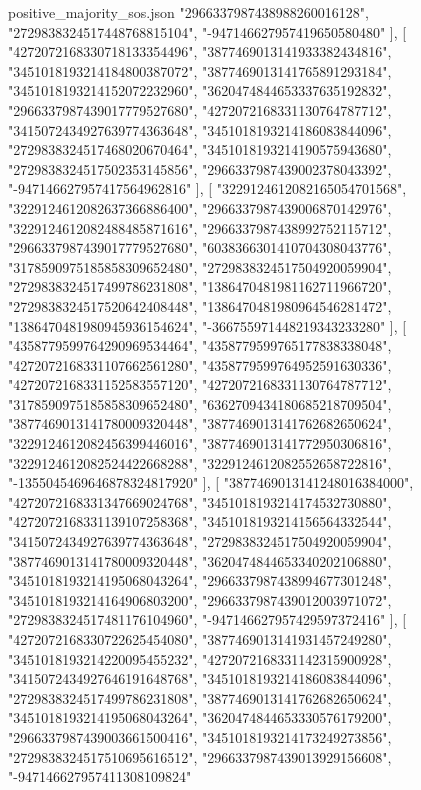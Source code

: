 \begin{filecontents*}[overwrite]{positive_majority_sos.json}
    "2966337987438988260016128",
    "2729838324517448768815104",
    "-947146627957419650580480"
   ],
   [
    "4272072168330718133354496",
    "3877469013141933382434816",
    "3451018193214184800387072",
    "3877469013141765891293184",
    "3451018193214152072232960",
    "3620474844653337635192832",
    "2966337987439017779527680",
    "4272072168331130764787712",
    "3415072434927639774363648",
    "3451018193214186083844096",
    "2729838324517468020670464",
    "3451018193214190575943680",
    "2729838324517502353145856",
    "2966337987439002378043392",
    "-947146627957417564962816"
   ],
   [
    "3229124612082165054701568",
    "3229124612082637366886400",
    "2966337987439006870142976",
    "3229124612082488485871616",
    "2966337987438992752115712",
    "2966337987439017779527680",
    "6038366301410704308043776",
    "3178590975185858309652480",
    "2729838324517504920059904",
    "2729838324517499786231808",
    "1386470481981162711966720",
    "2729838324517520642408448",
    "1386470481980964546281472",
    "1386470481980945936154624",
    "-366755971448219343233280"
   ],
   [
    "4358779599764290969534464",
    "4358779599765177838338048",
    "4272072168331107662561280",
    "4358779599764952591630336",
    "4272072168331152583557120",
    "4272072168331130764787712",
    "3178590975185858309652480",
    "6362709434180685218709504",
    "3877469013141780009320448",
    "3877469013141762682650624",
    "3229124612082456399446016",
    "3877469013141772950306816",
    "3229124612082524422668288",
    "3229124612082552658722816",
    "-1355045469646878324817920"
   ],
   [
    "3877469013141248016384000",
    "4272072168331347669024768",
    "3451018193214174532730880",
    "4272072168331139107258368",
    "3451018193214156564332544",
    "3415072434927639774363648",
    "2729838324517504920059904",
    "3877469013141780009320448",
    "3620474844653340202106880",
    "3451018193214195068043264",
    "2966337987438994677301248",
    "3451018193214164906803200",
    "2966337987439012003971072",
    "2729838324517481176104960",
    "-947146627957429597372416"
   ],
   [
    "4272072168330722625454080",
    "3877469013141931457249280",
    "3451018193214220095455232",
    "4272072168331142315900928",
    "3415072434927646191648768",
    "3451018193214186083844096",
    "2729838324517499786231808",
    "3877469013141762682650624",
    "3451018193214195068043264",
    "3620474844653330576179200",
    "2966337987439003661500416",
    "3451018193214173249273856",
    "2729838324517510695616512",
    "2966337987439013929156608",
    "-947146627957411308109824"

\end{filecontents*}
